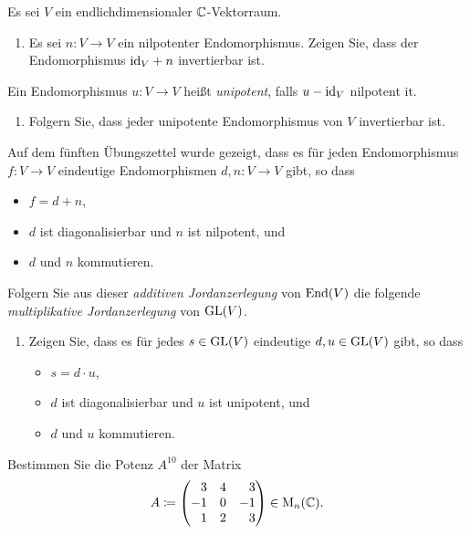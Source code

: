 \documentclass[a4paper,10pt]{scrartcl}
\begin{document}
\begin{question}
  Es sei $V$ ein endlichdimensionaler $\mathbb{C}$-Vektorraum.
  \begin{enumerate}
    \item
      Es sei $n \colon V \to V$ ein nilpotenter Endomorphismus.
      Zeigen Sie, dass der Endomorphismus ${\operatorname{id}_V} + n$ invertierbar ist.
  \end{enumerate}
  Ein Endomorphismus $u \colon V \to V$ heißt \emph{unipotent}, falls $u - \operatorname{id}_V$ nilpotent it.
  \begin{enumerate}[resume]
    \item
      Folgern Sie, dass jeder unipotente Endomorphismus von $V$ invertierbar ist.
  \end{enumerate}
  Auf dem fünften Übungszettel wurde gezeigt, dass es für jeden Endomorphismus $f \colon V \to V$ eindeutige Endomorphismen $d,n \colon V \to V$ gibt, so dass
  \begin{itemize}
    \item 
      $f = d + n$,
    \item
      $d$ ist diagonalisierbar und $n$ ist nilpotent, und
    \item
      $d$ und $n$ kommutieren.
  \end{itemize}
  Folgern Sie aus dieser \emph{additiven Jordanzerlegung} von $\operatorname{End}(V)$ die folgende \emph{multiplikative Jordanzerlegung} von $\operatorname{GL}(V)$.
  \begin{enumerate}[resume]
    \item
      Zeigen Sie, dass es für jedes $s \in \operatorname{GL}(V)$ eindeutige $d, u \in \operatorname{GL}(V)$ gibt, so dass
      \begin{itemize}
        \item
          $s = d \cdot u$,
        \item
          $d$ ist diagonalisierbar und $u$ ist unipotent, und
        \item
          $d$ und $u$ kommutieren.
      \end{itemize}
  \end{enumerate}
\end{question}


\begin{question}
  Bestimmen Sie die Potenz $A^{10}$ der Matrix
  \[
    A
    \coloneqq
    \begin{pmatrix*}[r]
       3  & 4 &  3      \\
      -1  & 0 & -1      \\
       1  & 2 &  3
    \end{pmatrix*}
    \in \Mat_n(\Cbb).
  \]
\end{question}
\end{document}
